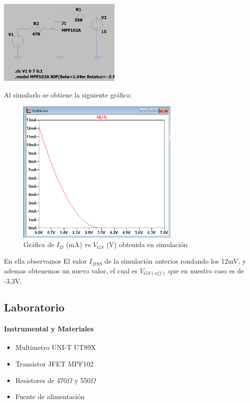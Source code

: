 \includegraphics[width=6cm]{./imagenes/Circ2.png}

Al simularlo se obtiene la siguiente gráfica:
\begin{figure}[ht]
    \centering
    \includegraphics[width=8cm]{./imagenes/Sim2.png}
    \caption{Gráfica de $I_D$ (mA) vs $V_{GS}$ (V) obtenida en simulación}
    \label{fig:sim2}
\end{figure}

En ella observamos El valor $I_{DSS}$ de la simulación anterios rondando los 12mV, y ademas obtenemos un nuevo valor, el cual es $V_{GS(off)}$ que en nuestro caso es de -3,3V.

\subsection{Laboratorio}

\paragraph{Instrumental y Materiales}
\begin{itemize}
    \item Multimetro UNI-T UT89X
    \item Transistor JFET MPF102
    \item Resistores de 470$\Omega$ y 550$\Omega$
    \item Fuente de alimentación
\end{itemize}

